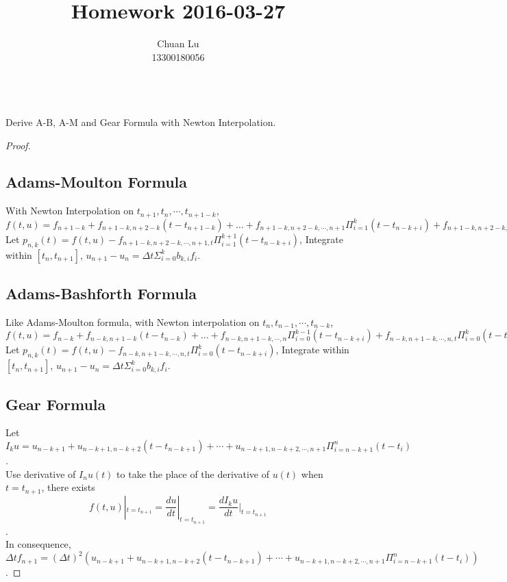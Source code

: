 \documentclass{article}
\newenvironment{problem}[2][Problem]{\begin{trivlist}
\item[\hskip \labelsep {\bfseries #1}\hskip \labelsep {\bfseries #2.}]}{\end{trivlist}}
\begin{document}
\title{Homework 2016-03-27}
\author{Chuan Lu\\
13300180056}

\maketitle

\begin{problem}{1}
\text{ }\\
Derive A-B, A-M and Gear Formula with Newton Interpolation.
\end{problem}

\begin{proof}
\subsection{Adams-Moulton Formula} 
With Newton Interpolation on $t_{n+1}, t_{n}, \cdots, t_{n+1-k}$, $f(t, u) = f_{n+1-k} + f_{n+1-k, n+2-k}(t - t_{n+1-k}) + \dots + f_{n+1-k, n+2-k ,\cdots, n+1}\Pi_{i=1}^{k}(t-t_{n-k+i}) + f_{n+1-k, n+2-k, \cdots, n+1, t}\Pi_{i=1}^{k+1}(t-t_{n-k+i}).$ \\
Let $p_{n, k}(t) = f(t, u) - f_{n+1-k, n+2-k, \cdots, n+1, t}\Pi_{i=1}^{k+1}(t-t_{n-k+i})$, 
Integrate within $[t_{n}, t_{n+1}]$, $u_{n+1} - u_{n} = \Delta t\Sigma_{i=0}^{k}b_{k, i}f_{i}$. 
\subsection{Adams-Bashforth Formula}
Like Adams-Moulton formula, with Newton interpolation on $t_{n}, t_{n-1}, \cdots, t_{n-k}$, $f(t, u) = f_{n-k} + f_{n-k, n+1-k}(t - t_{n-k}) + \dots + f_{n-k, n+1-k ,\cdots, n}\Pi_{i=0}^{k-1}(t-t_{n-k+i}) + f_{n-k, n+1-k, \cdots, n, t}\Pi_{i=0}^{k}(t-t_{n-k+i}).$ \\
Let $p_{n, k}(t) = f(t, u) - f_{n-k, n+1-k, \cdots, n, t}\Pi_{i=0}^{k}(t-t_{n-k+i})$, 
Integrate within $[t_{n}, t_{n+1}]$, $u_{n+1} - u_{n} = \Delta t\Sigma_{i=0}^{k}b_{k, i}f_{i}$. 
\subsection{Gear Formula}
Let $I_{k}u = u_{n-k+1} + u_{n-k+1, n-k+2}(t - t_{n-k+1}) + \cdots + u_{n-k+1, n-k+2, \cdots, n+1}\Pi_{i = n-k+1}^{n}(t-t_{i})$. \\
Use derivative of $I_{n}u(t)$ to take the place of the derivative of $u(t)$ when $t = t_{n+1}$, there exists $$f(t, u)|_{t = t_{n+1}} = \frac{du}{dt}|_{t=t_{n+1}} = \frac{dI_{k}u}{dt}|_{t=t_{n+1}}$$. \\
In consequence, $\Delta tf_{n+1} = (\Delta t)^{2}(u_{n-k+1} + u_{n-k+1, n-k+2}(t - t_{n-k+1}) + \cdots + u_{n-k+1, n-k+2, \cdots, n+1}\Pi_{i = n-k+1}^{n}(t-t_{i}))$.
\end{proof}
\end{document}
